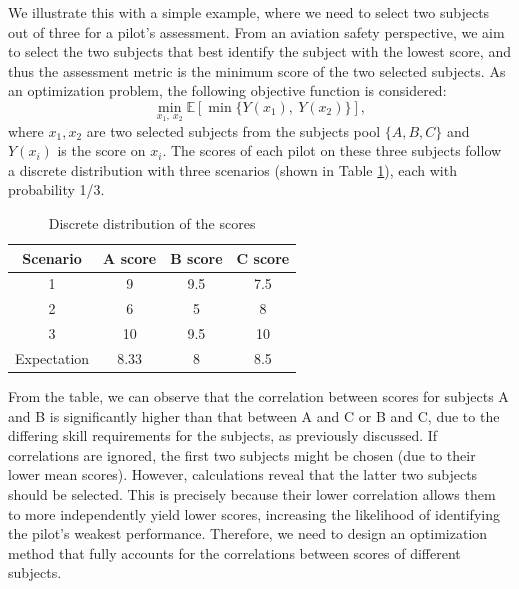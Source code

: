 \documentclass[opre,sglanonrev]{informs4}
\begin{document}
We illustrate this with a simple example, where we need to select two subjects out of three for a pilot's assessment. From an aviation safety perspective, we aim to select the two subjects that best identify the subject with the lowest score, and thus the assessment metric is the minimum score of the two selected subjects. As an optimization problem, the following objective function is considered:
\begin{equation}
	\min_{x_1, \ x_2} \mathbb{E}[\min\{Y(x_1), \ Y(x_2) \} ], 
	\label{example}
\end{equation}
where $x_1,x_2$ are two selected subjects from the subjects pool $\{A,B,C\}$ and $Y(x_i)$ is the score on $x_i$. The scores of each pilot on these three subjects follow a discrete distribution with three scenarios (shown in Table \ref{tab:example}), each with probability 1/3.
\begin{table}[ht]
	\centering
	\caption{Discrete distribution of the scores}
	\label{tab:example}
	\begin{tabular}{cccc} 
		Scenario & A score & B score & C score \\ \hline 
		1 & 9 & 9.5 & 7.5\\
		2 & 6 & 5 & 8\\
		3 & 10 & 9.5 & 10\\
		Expectation & 8.33 & 8 & 8.5\\
	\end{tabular}
\end{table}
From the table, we can observe that the correlation between scores for subjects A and B is significantly higher than that between A and C or B and C, due to the differing skill requirements for the subjects, as previously discussed. If correlations are ignored, the first two subjects might be chosen (due to their lower mean scores). However, calculations reveal that the latter two subjects should be selected. This is precisely because their lower correlation allows them to more independently yield lower scores, increasing the likelihood of identifying the pilot’s weakest performance. Therefore, we need to design an optimization method that fully accounts for the correlations between scores of different subjects.
\end{document}
